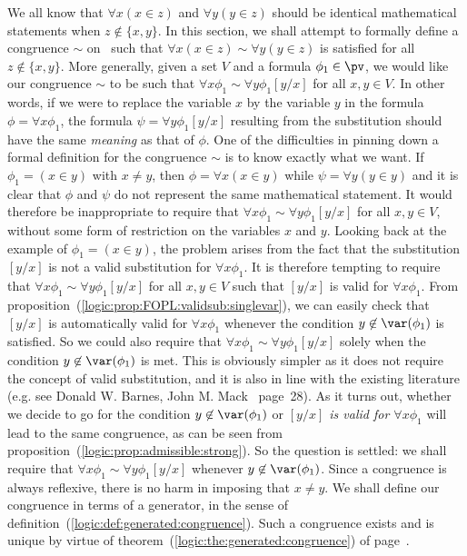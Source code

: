 We all know that $\forall x(x\in z)$ and $\forall y(y\in z)$ should
be identical mathematical statements when $z\not\in\{x,y\}$. In this
section, we shall attempt to formally define a congruence $\sim$ on
\pv\ such that $\forall x(x\in z)\sim\forall y(y\in z)$ is satisfied
for all $z\not\in\{x,y\}$. More generally, given a set $V$ and a
formula $\phi_{1}\in\pv$, we would like our congruence $\sim$ to be
such that $\forall x\phi_{1}\sim\forall y\phi_{1}[y/x]$ for all
$x,y\in V$. In other words, if we were to replace the variable $x$
by the variable $y$ in the formula $\phi=\forall x\phi_{1}$, the
formula $\psi=\forall y\phi_{1}[y/x]$ resulting from the
substitution should have the same {\em meaning} as that of $\phi$.
One of the difficulties in pinning down a formal definition for the
congruence $\sim$ is to know exactly what we want. If
$\phi_{1}=(x\in y)$ with $x\neq y$, then $\phi=\forall x(x\in y)$
while $\psi=\forall y(y\in y)$ and it is clear that $\phi$ and
$\psi$ do not represent the same mathematical statement. It would
therefore be inappropriate to require that $\forall
x\phi_{1}\sim\forall y\phi_{1}[y/x]$ for all $x,y\in V$, without
some form of restriction on the variables $x$ and $y$. Looking back
at the example of $\phi_{1}=(x\in y)$, the problem arises from the
fact that the substitution $[y/x]$ is not a valid substitution for
$\forall x\phi_{1}$. It is therefore tempting to require that
$\forall x\phi_{1}\sim\forall y\phi_{1}[y/x]$ for all $x,y\in V$
such that $[y/x]$ is valid for $\forall x\phi_{1}$. From
proposition~(\ref{logic:prop:FOPL:validsub:singlevar}), we can
easily check that $[y/x]$ is automatically valid for $\forall
x\phi_{1}$ whenever the condition $y\not\in\var(\phi_{1})$ is
satisfied. So we could also require that $\forall
x\phi_{1}\sim\forall y\phi_{1}[y/x]$ solely when the condition
$y\not\in\var(\phi_{1})$ is met. This is obviously simpler as it
does not require the concept of valid substitution, and it is also
in line with the existing literature (e.g. see Donald W. Barnes,
John M. Mack~\cite{AlgLog} page~28). As it turns out, whether we
decide to go for the condition $y\not\in\var(\phi_{1})$ or {\em
$[y/x]$ is valid for $\forall x\phi_{1}$} will lead to the same
congruence, as can be seen from
proposition~(\ref{logic:prop:admissible:strong}). So the question is
settled: we shall require that $\forall x\phi_{1}\sim\forall
y\phi_{1}[y/x]$ whenever $y\not\in\var(\phi_{1})$. Since a
congruence is always reflexive, there is no harm in imposing that
$x\neq y$. We shall define our congruence in terms of a generator,
in the sense of definition~(\ref{logic:def:generated:congruence}).
Such a congruence exists and is unique by virtue of
theorem~(\ref{logic:the:generated:congruence}) of
page~\pageref{logic:the:generated:congruence}. 


